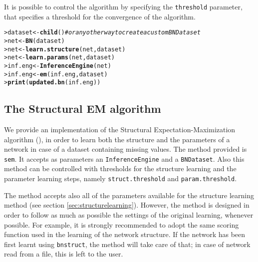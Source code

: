 \documentclass{article}\usepackage[]{graphicx}\usepackage[]{color}
\makeatletter
\newcommand{\hlcom}[1]{\textcolor[rgb]{0.678,0.584,0.686}{\textit{#1}}}%
\newcommand{\hlstd}[1]{\textcolor[rgb]{0.345,0.345,0.345}{#1}}%
\newcommand{\hlkwb}[1]{\textcolor[rgb]{0.69,0.353,0.396}{#1}}%
\newcommand{\hlkwd}[1]{\textcolor[rgb]{0.737,0.353,0.396}{\textbf{#1}}}%
\newenvironment{kframe}{%
 \def\at@end@of@kframe{}%
 \ifinner\ifhmode%
  \def\at@end@of@kframe{\end{minipage}}%
  \begin{minipage}{\columnwidth}%
 \fi\fi%
 \def\FrameCommand##1{\hskip\@totalleftmargin \hskip-\fboxsep
 \colorbox{shadecolor}{##1}\hskip-\fboxsep
     \hskip-\linewidth \hskip-\@totalleftmargin \hskip\columnwidth}%
 \MakeFramed {\advance\hsize-\width
   \@totalleftmargin\z@ \linewidth\hsize
   \@setminipage}}%
 {\par\unskip\endMakeFramed%
 \at@end@of@kframe}
\newenvironment{knitrout}{}{} %
\newcommand{\Robject}[1]{{\texttt{#1}}}
\newcommand{\Rpackage}[1]{{\texttt{#1}}}
\newcommand{\Rmethod}[1]{{\texttt{#1}}}
\newcommand{\Rfunarg}[1]{{\texttt{#1}}}
\makeatother
\begin{document}
It is possible to control the algorithm by specifying the \Rfunarg{threshold} parameter, that specifies a threshold
for the convergence of the algorithm.
\begin{knitrout}
\color{fgcolor}\begin{kframe}
\begin{alltt}
\hlstd{> }\hlstd{dataset} \hlkwb{<-} \hlkwd{child}\hlstd{()} \hlcom{# or any other way to create a custom BNDataset}
\hlstd{> }\hlstd{net}     \hlkwb{<-} \hlkwd{BN}\hlstd{(dataset)}
\hlstd{> }\hlstd{net}     \hlkwb{<-} \hlkwd{learn.structure}\hlstd{(net, dataset)}
\hlstd{> }\hlstd{net}     \hlkwb{<-} \hlkwd{learn.params}\hlstd{(net, dataset)}
\hlstd{> }\hlstd{inf.eng} \hlkwb{<-} \hlkwd{InferenceEngine}\hlstd{(net)}
\hlstd{> }\hlstd{inf.eng} \hlkwb{<-} \hlkwd{em}\hlstd{(inf.eng, dataset)}
\hlstd{> }\hlkwd{print}\hlstd{(}\hlkwd{updated.bn}\hlstd{(inf.eng))}
\end{alltt}
\end{kframe}
\end{knitrout}

\subsection{The Structural EM algorithm}
We provide an implementation of the Structural Expectation-Maximization algorithm
(\citet{friedman1997learning,friedman1998bayesian}),
in order to learn both the structure and the parameters of a network in case of a dataset containing missing values.
The method provided is \Rmethod{sem}. It accepts as parameters an \Robject{InferenceEngine} and a \Robject{BNDataset}.
Also this method can be controlled with thresholds for the structure learning and the parameter learning steps, namely
\Rfunarg{struct.threshold} and \Rfunarg{param.threshold}.

The method accepts also all of the parameters available for the structure learning method (see section \ref{sec:structurelearning}).
However, the method is designed in order to follow as much as possible the settings of the original learning, whenever possible.
For example, it is strongly recommended to adopt the same scoring function used in the learning of the network structure.
If the network has been first learnt using \Rpackage{bnstruct}, the method will take care of that;
in case of network read from a file, this is left to the user.
\end{document}
